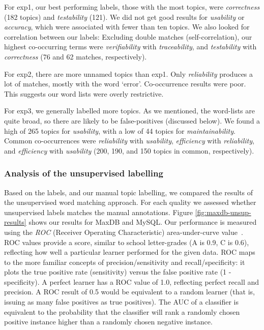 \documentclass[]{sig-alternate}
\begin{document}
For \textsf{exp1}, our best performing labels, those with the most topics, were \emph{correctness} (182 topics) and \emph{testability} (121). 
We did not get good results for \emph{usability} or \emph{accuracy}, which were associated with fewer than ten topics. 
We also looked for correlation between our labels: Excluding double matches (self-correlation), our highest co-occurring terms were \emph{verifiability} with \emph{traceability}, and \emph{testability} with \emph{correctness} (76 and 62 matches, respectively).

For \textsf{exp2}, there are more unnamed topics than \textsf{exp1}. 
Only \emph{reliability} produces a lot of matches, mostly with the word `error'. 
Co-occurrence results were poor. This suggests our word lists were overly restrictive.

For \textsf{exp3}, we generally labelled more topics. 
As we mentioned, the word-lists are quite broad, so there are likely to be false-positives (discussed below). 
We found a high of 265 topics for \emph{usability}, with a low of 44 topics for \emph{maintainability}. 
Common co-occurrences were \emph{reliability} with \emph{usability}, \emph{efficiency} with \emph{reliability}, and \emph{efficiency} with \emph{usability} (200, 190, and 150 topics in common, respectively). 


\subsubsection{Analysis of the unsupervised labelling}

Based on the labels, and our manual topic labelling, we compared the results of the unsupervised word matching approach. 
For each quality we assessed whether unsupervised labels matches the manual annotations.
Figure \ref{fig:maxdb-unsup-results} shows our results for MaxDB and MySQL. 
Our performance is measured using the \emph{ROC} (Receiver Operating Characteristic) area-under-curve value~\cite{Fawcett2006861}. 
ROC values provide a score, similar to school letter-grades (A is 0.9, C is 0.6), reflecting how well a particular learner performed for the given data. 
ROC maps to the more familiar concepts of precision/sensitivity and recall/specificity: it plots the true positive rate (sensitivity) versus the false positive rate (1 - specificity). 
A perfect learner has a ROC value of 1.0, reflecting perfect recall and precision. 
A ROC result of 0.5 would be equivalent to a random learner (that is, issuing as many false positives as true positives). 
The AUC of a classifier is equivalent to the probability that the classifier will rank a randomly chosen positive instance higher than a randomly chosen negative instance.
\end{document}
